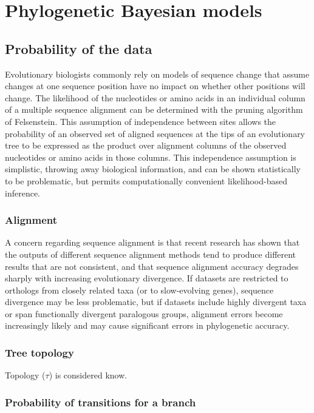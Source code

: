 \chapter{Phylogenetic Bayesian models}
\minitoc
\label{sec:phylo_bayes}

\section{Probability of the data}

Evolutionary biologists commonly rely on models of sequence change that assume changes at one sequence position have no impact on whether other positions will change. The \gls{likelihood} of the nucleotides or amino acids in an individual column of a multiple sequence alignment can be determined with the pruning algorithm of Felsenstein. This assumption of independence between sites allows the probability of an observed set of aligned sequences at the tips of an evolutionary tree to be expressed as the product over alignment columns of the observed nucleotides or amino acids in those columns. This independence assumption is simplistic, throwing away biological information, and can be shown statistically to be problematic, but permits computationally convenient likelihood-based inference.

\subsection{Alignment}

A concern regarding sequence alignment is that recent research has shown that the outputs of different sequence alignment methods tend to produce different results that are not consistent, and that sequence alignment accuracy degrades sharply with increasing evolutionary divergence.
If datasets are restricted to orthologs from closely related taxa (or to slow-evolving genes), sequence divergence may be less problematic, but if datasets include highly divergent taxa or span functionally divergent paralogous groups, alignment errors become increasingly likely and may cause significant errors in phylogenetic accuracy.

\subsection{Tree topology}

Topology ($\tau$) is considered know.

\subsection{Probability of transitions for a branch}

